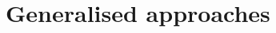 \documentclass[a4paper,11pt,twoside]{article}
\theoremstyle{definition}
\theoremstyle{remark}
\begin{document}
\section{Generalised approaches}
%
%
%
\end{document}
